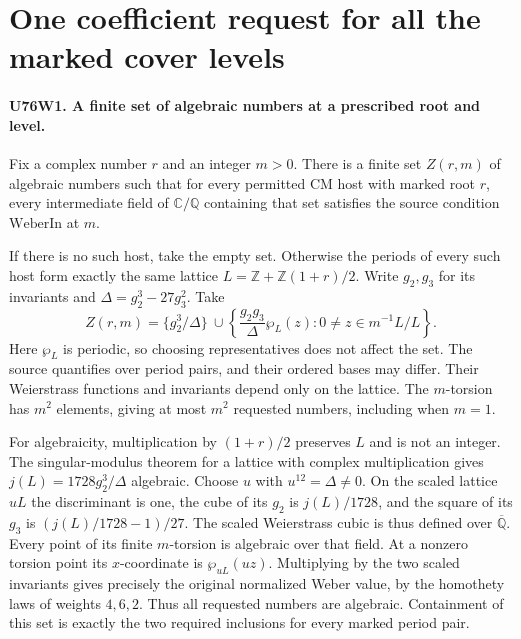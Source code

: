 \section{One coefficient request for all the marked cover levels}

\paragraph{U76W1. A finite set of algebraic numbers at a prescribed root and level.}
Fix a complex number $r$ and an integer $m>0$. There is a finite
set $Z(r,m)$ of algebraic numbers such that for every permitted CM
host with marked root $r$, every intermediate field of $\mathbb C/\mathbb Q$
containing that set satisfies the source condition $\mathrm{WeberIn}$ at $m$.

If there is no such host, take the empty set. Otherwise the periods of
every such host form exactly the same lattice
$L=\mathbb Z+\mathbb Z(1+r)/2$. Write $g_2,g_3$ for its invariants
and $\Delta=g_2^3-27g_3^2$. Take
\[
 Z(r,m)=\{g_2^3/\Delta\}\ \cup \left\{\frac{g_2g_3}{\Delta}\wp_L(z):
               0\ne z\in m^{-1}L/L\right\}.
\]
Here $\wp_L$ is periodic, so choosing representatives does not affect
the set. The source quantifies over period pairs, and their ordered
bases may differ. Their Weierstrass functions and invariants depend
only on the lattice. The $m$-torsion has $m^2$ elements, giving
at most $m^2$ requested numbers, including when $m=1$.

For algebraicity, multiplication by $(1+r)/2$ preserves $L$ and is
not an integer. The singular-modulus theorem for a lattice with
complex multiplication gives $j(L)=1728g_2^3/\Delta$ algebraic.
Choose $u$ with $u^{12}=\Delta\ne0$. On the scaled lattice $uL$
the discriminant is one, the cube of its $g_2$ is $j(L)/1728$,
and the square of its $g_3$ is $(j(L)/1728-1)/27$. The scaled
Weierstrass cubic is thus defined over $\overline{\mathbb Q}$.
Every point of its finite $m$-torsion is algebraic over that field.
At a nonzero torsion point its $x$-coordinate is $\wp_{uL}(uz)$.
Multiplying by the two scaled invariants gives precisely the
original normalized Weber value, by the homothety laws of weights
$4,6,2$. Thus all requested numbers are algebraic. Containment
of this set is exactly the two required inclusions for every marked
period pair.

